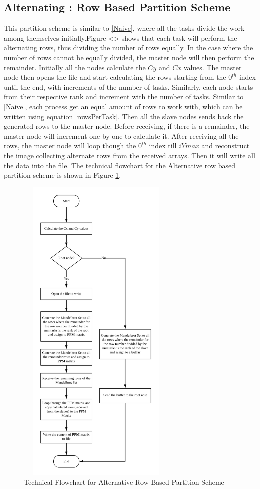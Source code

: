 \documentclass[conference]{IEEEtran}
\begin{document}
			\subsection{Alternating : Row Based Partition Scheme}\label{Alternating}
			This partition scheme is similar to \ref{Naive}, where all the tasks divide the work among themselves initially.Figure <> shows that each task will perform the alternating rows, thus dividing the number of rows equally. In the case where the number of rows cannot be equally divided, the master node will then perform the remainder. Initially all the nodes calculate the $Cy$ and $Cx$ values. The master node then opens the file and start calculating the rows starting from the $0^{th}$ index until the end, with increments of the number of tasks. Similarly, each node starts from their respective rank and increment with the number of tasks. Similar to \ref{Naive}, each process get an equal amount of rows to work with, which can be written using equation \ref{rowsPerTask}. Then all the slave nodes sends back the generated rows to the master node. Before receiving, if there is a remainder, the master node will increment one by one to calculate it. After receiving all the rows, the master node will loop though the $0^{th}$ index till $iYmax$ and reconstruct the image collecting alternate rows from the received arrays. Then it will write all the data into the file.
			The technical flowchart for the Alternative row based partition scheme is shown in Figure \ref{Alte}.

			\begin{figure}[H]
				\centering
				\includegraphics[width=3in,height=6in]{Alternating}
				\caption{Technical Flowchart for Alternative Row Based Partition Scheme}
				\label{Alte}
			\end{figure}
\end{document}
